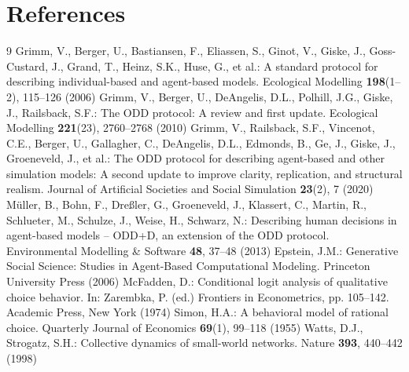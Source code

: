 \documentclass[11pt]{article}
\begin{document}
\section{References}
\begin{thebibliography}{9}
 Grimm, V., Berger, U., Bastiansen, F., Eliassen, S., Ginot, V., Giske, J., Goss-Custard, J., Grand, T., Heinz, S.K., Huse, G., et al.: A standard protocol for describing individual-based and agent-based models. Ecological Modelling \textbf{198}(1--2), 115--126 (2006)
 Grimm, V., Berger, U., DeAngelis, D.L., Polhill, J.G., Giske, J., Railsback, S.F.: The ODD protocol: A review and first update. Ecological Modelling \textbf{221}(23), 2760--2768 (2010)
 Grimm, V., Railsback, S.F., Vincenot, C.E., Berger, U., Gallagher, C., DeAngelis, D.L., Edmonds, B., Ge, J., Giske, J., Groeneveld, J., et al.: The ODD protocol for describing agent-based and other simulation models: A second update to improve clarity, replication, and structural realism. Journal of Artificial Societies and Social Simulation \textbf{23}(2), 7 (2020)
 M\"uller, B., Bohn, F., Dre\ss ler, G., Groeneveld, J., Klassert, C., Martin, R., Schlueter, M., Schulze, J., Weise, H., Schwarz, N.: Describing human decisions in agent-based models -- ODD+D, an extension of the ODD protocol. Environmental Modelling \& Software \textbf{48}, 37--48 (2013)
 Epstein, J.M.: Generative Social Science: Studies in Agent-Based Computational Modeling. Princeton University Press (2006)
 McFadden, D.: Conditional logit analysis of qualitative choice behavior. In: Zarembka, P. (ed.) Frontiers in Econometrics, pp. 105--142. Academic Press, New York (1974)
 Simon, H.A.: A behavioral model of rational choice. Quarterly Journal of Economics \textbf{69}(1), 99--118 (1955)
 Watts, D.J., Strogatz, S.H.: Collective dynamics of small-world networks. Nature \textbf{393}, 440--442 (1998)
\end{thebibliography}
\end{document}

